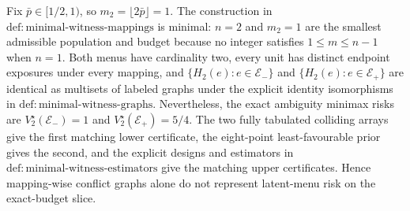 Fix \(\bar p\in[1/2,1)\), so \(m_2=\lfloor2\bar p\rfloor=1\). The construction in \(\mathrm{def{:}minimal\text{-}witness\text{-}mappings}\) is minimal: \(n=2\) and \(m_2=1\) are the smallest admissible population and budget because no integer satisfies \(1\le m\le n-1\) when \(n=1\). Both menus have cardinality two, every unit has distinct endpoint exposures under every mapping, and \(\{H_2(e):e\in\mathcal E_-\}\) and \(\{H_2(e):e\in\mathcal E_+\}\) are identical as multisets of labeled graphs under the explicit identity isomorphisms in \(\mathrm{def{:}minimal\text{-}witness\text{-}graphs}\). Nevertheless, the exact ambiguity minimax risks are \(V_2^\star(\mathcal E_-)=1\) and \(V_2^\star(\mathcal E_+)=5/4\). The two fully tabulated colliding arrays give the first matching lower certificate, the eight-point least-favourable prior gives the second, and the explicit designs and estimators in \(\mathrm{def{:}minimal\text{-}witness\text{-}estimators}\) give the matching upper certificates. Hence mapping-wise conflict graphs alone do not represent latent-menu risk on the exact-budget slice.
